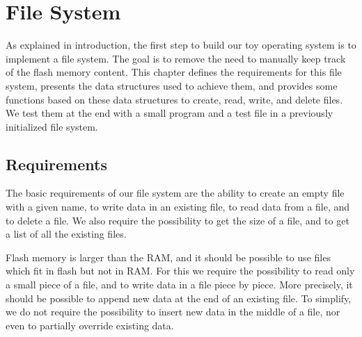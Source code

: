 
\renewcommand{\rustfile}{chapter1}
\setcounter{rustid}{0}


\chapter{File System}\label{chapter:file-system}

As explained in introduction, the first step to build our toy operating system
is to implement a file system. The goal is to remove the need to manually keep
track of the flash memory content. This chapter defines the requirements for
this file system, presents the data structures used to achieve them, and
provides some functions based on these data structures to create, read,
write, and delete files. We test them at the end with a small program and a
test file in a previously initialized file system.

\section{Requirements}

The basic requirements of our file system are the ability to create an empty
file with a given name, to write data in an existing file, to read data from a
file, and to delete a file. We also require the possibility to get the size of
a file, and to get a list of all the existing files.

Flash memory is larger than the RAM, and it should be possible to use files
which fit in flash but not in RAM. For this we require the possibility to read
only a small piece of a file, and to write data in a file piece by piece. More
precisely, it should be possible to append new data at the end of an existing
file. To simplify, we do not require the possibility to insert new data in the
middle of a file, nor even to partially override existing data.

